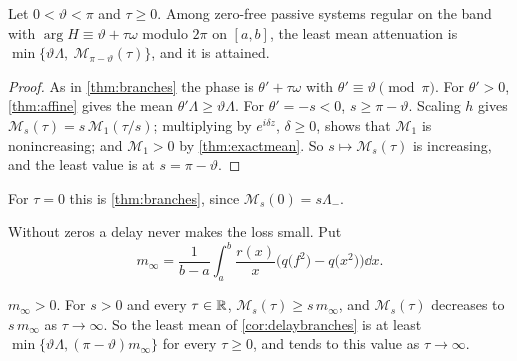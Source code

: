 \begin{corollary}\label{cor:delaybranches}
Let $0<\vartheta<\pi$ and $\tau\ge0$. Among zero-free passive systems regular
on the band with $\arg H\equiv\vartheta+\tau\omega$ modulo $2\pi$ on $[a,b]$,
the least mean attenuation is
$\min\{\vartheta\Lambda,\ \mathcal M_{\pi-\vartheta}(\tau)\}$, and it is
attained.
\end{corollary}

\begin{proof}
As in \cref{thm:branches} the phase is $\theta'+\tau\omega$ with
$\theta'\equiv\vartheta\pmod\pi$. For $\theta'>0$, \cref{thm:affine} gives the
mean $\theta'\Lambda\ge\vartheta\Lambda$. For $\theta'=-s<0$, $s\ge\pi-\vartheta$.
Scaling $h$ gives $\mathcal M_s(\tau)=s\,\mathcal M_1(\tau/s)$; multiplying by
$e^{i\delta z}$, $\delta\ge0$, shows that $\mathcal M_1$ is nonincreasing; and
$\mathcal M_1>0$ by \cref{thm:exactmean}. So $s\mapsto\mathcal M_s(\tau)$ is
increasing, and the least value is at $s=\pi-\vartheta$.
\end{proof}

For $\tau=0$ this is \cref{thm:branches}, since $\mathcal M_s(0)=s\Lambda_-$.

Without zeros a delay never makes the loss small. Put
\[
m_\infty=\frac1{b-a}\int_a^b\frac{r(x)}x\Big(q\big(f^2\big)-q\big(x^2\big)\Big)\dd x .
\]

\begin{proposition}\label{prop:floor}
$m_\infty>0$. For $s>0$ and every $\tau\in\mathbb R$, $\mathcal M_s(\tau)\ge s\,m_\infty$,
and $\mathcal M_s(\tau)$ decreases to $s\,m_\infty$ as $\tau\to\infty$. So the
least mean of \cref{cor:delaybranches} is at least
$\min\{\vartheta\Lambda,(\pi-\vartheta)m_\infty\}$ for every $\tau\ge0$, and tends
to this value as $\tau\to\infty$.
\end{proposition}

